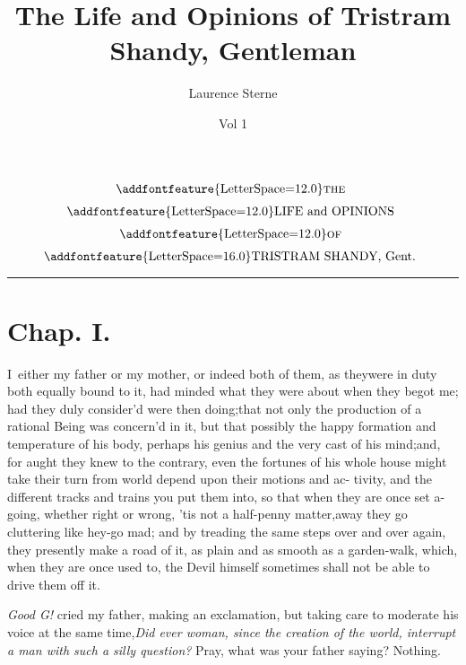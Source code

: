 \documentclass{article}
\title{The Life and Opinions of Tristram Shandy, Gentleman}
\author{Laurence Sterne}
\date{Vol 1}
\begin{document}
\pagestyle{fancy}
\thispagestyle{empty}
\[\vbox{\openup 6pt\halign{\hss # \hss\cr
\addfontfeature{LetterSpace=12.0}\textsc{the}\cr
\addfontfeature{LetterSpace=12.0}LIFE and OPINIONS\cr
\addfontfeature{LetterSpace=12.0}\textsc{of}\cr
{\addfontfeature{LetterSpace=16.0}TRISTRAM SHANDY}, Gent.\cr}}\]

\vskip 6pt
\hrule
\setlength{\baselineskip}{14pt}  %

\section{Chap. I.}

\lettrine{I}{\,} either my father or my mother,
or indeed both of them, as
they\break were in duty both equally bound to it, had minded what they were about
when they begot me; had they duly consider’d 
were then doing;\tsk  that not only the production of a rational Being
was concern’d in it, but that possibly the happy formation and temperature of
his body,\pb 
perhaps his genius and the very cast of\break
his mind;\tsk  and, for aught they knew to the contrary, even the fortunes of his
whole house might take their turn from 
world depend upon their motions and ac-\pb 
tivity, and the different tracks and trains you put them into, so that when they are
once set a-going, whether right or wrong, ’tis not a half-penny matter,\tsk away
they go cluttering like hey-go mad; and by treading the same steps over and over
again, they presently make a road of it, as plain and as smooth as a garden-walk,
which, when they are once used to, the Devil himself sometimes shall not be able to
drive them off it.

\noindent
{}
\textit{Good G\tsk!} cried my father, making
an exclamation, but taking care to moderate his voice at the same
time,\tsh \textit{Did ever woman, since the creation of the
world, interrupt a man with such a silly question?} Pray, what
was your father saying?\tsh\break 
Nothing.
\end{document}

